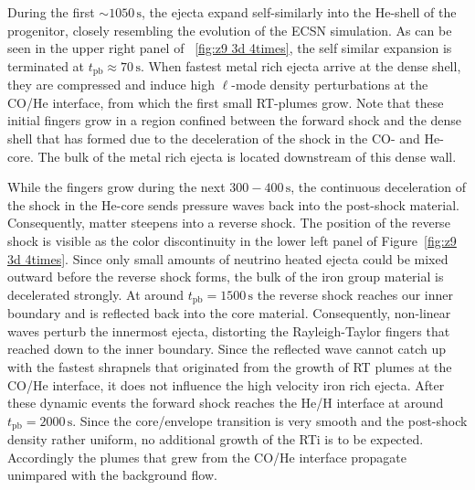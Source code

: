 \documentclass[fleqn,usenatbib]{mnras}
\newcommand{\tpb}{\ensuremath{t_{\text{pb}}}}
\newcommand{\s}{\ensuremath{\text{s}}}
\begin{document}
During the first $\sim 10\mathord{50}\,\s$, the ejecta expand self-similarly into the He-shell of the progenitor, closely resembling the evolution of the ECSN simulation.
As can be seen in the upper right panel of ~\ref{fig:z9 3d 4times}, the self similar expansion is terminated at $t_{\mathrm{pb}}\approx 70\,\text{s}$.
When fastest metal rich ejecta arrive at the dense shell, they are compressed and induce high $\ell$-mode density perturbations at the CO/He interface, from which the first small RT-plumes grow.
Note that these initial fingers grow in a region confined between the forward shock and the dense shell that has formed due to the deceleration of the shock in the CO- and He-core. The bulk of the metal rich ejecta is located downstream of this dense wall.

While the fingers grow during the next $300-400\,\s$, the continuous deceleration of the shock in the He-core sends pressure waves back into the post-shock material. Consequently, matter steepens into a reverse shock. The position of the reverse shock is visible as the color discontinuity in the lower left panel of Figure~\ref{fig:z9 3d 4times}. Since only small amounts of neutrino heated ejecta could be mixed outward before the reverse shock forms, the bulk of the iron group material is decelerated strongly.
At around $\tpb=1500\,\s$ the reverse shock reaches our inner boundary and is reflected back into the core material.
Consequently, non-linear waves perturb the innermost ejecta, distorting the Rayleigh-Taylor fingers that reached down to the inner boundary. Since the reflected wave cannot catch up with the fastest shrapnels that originated from the growth of RT plumes at the CO/He interface, it does not influence the high velocity iron rich ejecta.
After these dynamic events the forward shock reaches the He/H interface at around $\tpb=2000\,\text{s}$. Since the core/envelope transition is very smooth and the post-shock density rather uniform, no additional growth of the RTi is to be expected. Accordingly the plumes that grew from the CO/He interface propagate unimpared with the background flow. 
\end{document}
